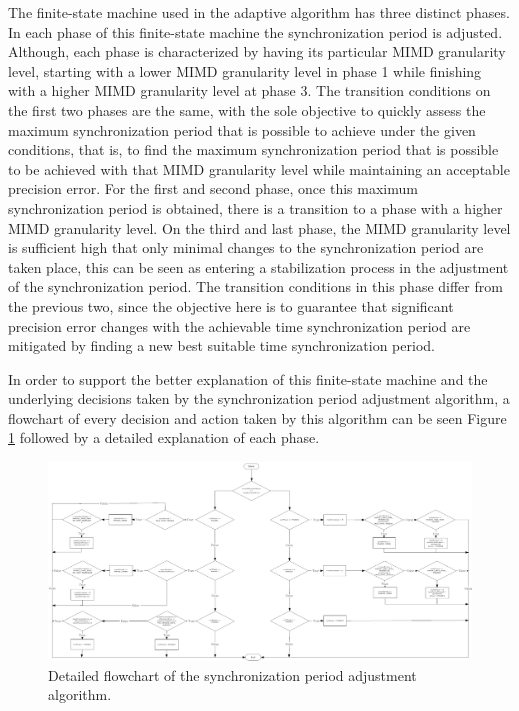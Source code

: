 The finite-state machine used in the adaptive algorithm has three distinct phases. In each phase of this finite-state machine the synchronization period is adjusted. Although, each phase is characterized by having its particular \ac{MIMD} granularity level, starting with a lower \ac{MIMD} granularity level in phase 1 while finishing with a higher \ac{MIMD} granularity level at phase 3. The transition conditions on the first two phases are the same, with the sole objective to quickly assess the maximum synchronization period that is possible to achieve under the given conditions, that is, to find the maximum synchronization period that is possible to be achieved with that \ac{MIMD} granularity level while maintaining an acceptable precision error. For the first and second phase, once this maximum synchronization period is obtained, there is a transition to a phase with a higher \ac{MIMD} granularity level. On the third and last phase, the \ac{MIMD} granularity level is sufficient high that only minimal changes to the synchronization period are taken place, this can be seen as entering a stabilization process in the adjustment of the synchronization period. The transition conditions in this phase differ from the previous two, since the objective here is to guarantee that significant precision error changes with the achievable time synchronization period are mitigated by finding a new best suitable time synchronization period.

In order to support the better explanation of this finite-state machine and the underlying decisions taken by the synchronization period adjustment algorithm, a flowchart of every decision and action taken by this algorithm can be seen Figure \ref{flow} followed by a detailed explanation of each phase.

\begin{figure}[!htb]
\begin{center}
\includegraphics[scale=0.4,angle=90]{./images/26-ttsp-flowchart.png}
\end{center}
\caption{Detailed flowchart of the synchronization period adjustment algorithm.}
\label{flow}
\end{figure}

